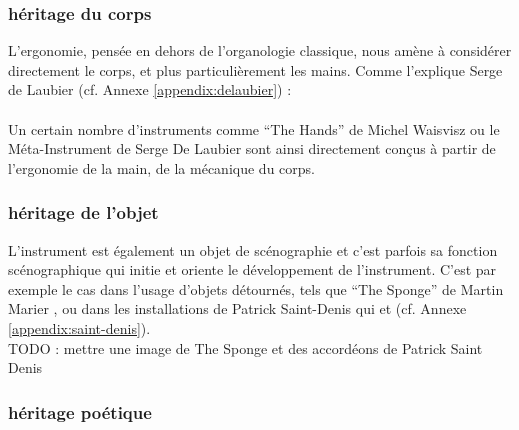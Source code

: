 \subsubsection{héritage du corps}
\noindent L'ergonomie, pensée en dehors de l'organologie classique, nous amène à considérer directement le corps, et plus particulièrement les mains. Comme l'explique Serge de Laubier (cf. Annexe \ref{appendix:delaubier}) :\\
\\

Un certain nombre d'instruments comme ``The Hands'' de Michel Waisvisz ou le Méta-Instrument de Serge De Laubier sont ainsi directement conçus à partir de l'ergonomie de la main, de la mécanique du corps.

\subsubsection{héritage de l'objet}

\noindent L'instrument est également un objet de scénographie et c'est parfois sa fonction scénographique qui initie et oriente le développement de l'instrument. C'est par exemple le cas dans l'usage d'objets détournés, tels que ``The Sponge'' de Martin Marier \cite{marier_sponge_2010}, ou dans les installations de Patrick Saint-Denis qui  et  (cf. Annexe \ref{appendix:saint-denis}).\\

TODO : mettre une image de The Sponge et des accordéons de Patrick Saint Denis

\subsubsection{héritage poétique}

